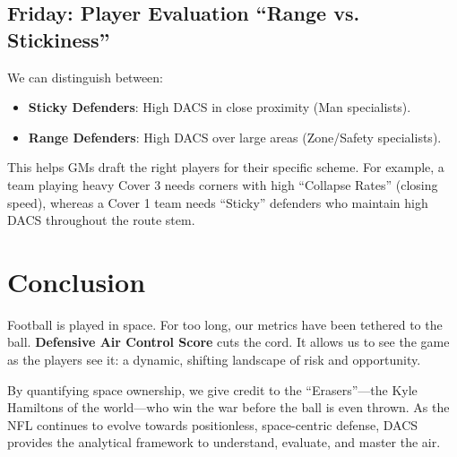 \documentclass{article}
\begin{document}
\subsection{Friday: Player Evaluation ``Range vs. Stickiness''}
We can distinguish between:
\begin{itemize}
    \item \textbf{Sticky Defenders}: High DACS in close proximity (Man specialists).
    \item \textbf{Range Defenders}: High DACS over large areas (Zone/Safety specialists).
\end{itemize}
This helps GMs draft the right players for their specific scheme. For example, a team playing heavy Cover 3 needs corners with high ``Collapse Rates'' (closing speed), whereas a Cover 1 team needs ``Sticky'' defenders who maintain high DACS throughout the route stem.

\section{Conclusion}

Football is played in space. For too long, our metrics have been tethered to the ball. \textbf{Defensive Air Control Score} cuts the cord. It allows us to see the game as the players see it: a dynamic, shifting landscape of risk and opportunity.

By quantifying space ownership, we give credit to the ``Erasers''—the Kyle Hamiltons of the world—who win the war before the ball is even thrown. As the NFL continues to evolve towards positionless, space-centric defense, DACS provides the analytical framework to understand, evaluate, and master the air.
\end{document}
